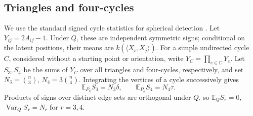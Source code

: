 \documentclass[11pt,reqno]{amsart}
\numberwithin{equation}{section}
\theoremstyle{definition}
\theoremstyle{remark}
\theoremstyle{definition}
\DeclareMathOperator{\Var}{Var}
\begin{document}
\subsection{Triangles and four-cycles}
We use the standard signed cycle statistics for spherical detection \cite{BDER,MWX}.
Let $Y_{ij}=2A_{ij}-1$. Under $Q$, these are independent symmetric signs;
conditional on the latent positions, their means are $k(\langle X_i,X_j\rangle)$.
For a simple undirected cycle $C$, considered without a starting point or orientation, write $Y_C=\prod_{e\in C}Y_e$.
Let $S_3,S_4$ be the sums of $Y_C$ over all triangles and four-cycles, respectively, and set
$N_3=\binom n3$, $N_4=3\binom n4$.
Integrating the vertices of a cycle successively gives
\[
 \mathbb E_{P_k}S_3=N_3\delta,\qquad
 \mathbb E_{P_k}S_4=N_4\tau.
\]
Products of signs over distinct edge sets are orthogonal under $Q$, so
$\mathbb E_QS_r=0$, $\Var_QS_r=N_r$ for $r=3,4$.
\end{document}
